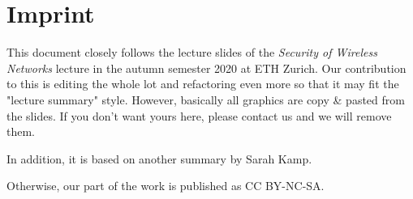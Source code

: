 %
%
\appendix


\section{Imprint}

This document closely follows the lecture slides of the \textit{Security of Wireless Networks} lecture in the autumn semester 2020 at ETH Zurich.
Our contribution to this is editing the whole lot and refactoring even more so that it may fit the "lecture summary" style.
However, basically all graphics are copy \& pasted from the slides. If you don't want yours here, please contact us and we will remove them.

In addition, it is based on another summary by Sarah Kamp.

Otherwise, our part of the work is published as CC BY-NC-SA.



%
%